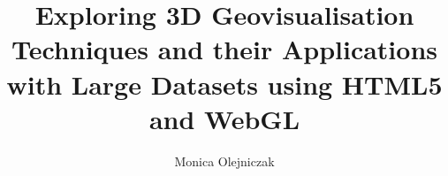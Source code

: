 \linespread{1.25}

\usepackage[left=30mm,top=35mm,right=30mm,bottom=35mm,headheight=30pt]{geometry}

\usepackage[utf8]{inputenc}

\usepackage[dvipsnames]{xcolor}

\usepackage{scrlayer-scrpage}
\cfoot{\pagemark}

\title{Exploring 3D Geovisualisation Techniques and their Applications with Large Datasets using HTML5 and WebGL}
\author{Monica Olejniczak}

\newcommand{\supervisor}{Shamus Smith}
\newcommand{\degree}{Bachelor of Engineering (Honours) (Software)}
\newcommand{\school}{School of Electrical Engineering and Computer Science}
\newcommand{\university}{University of Newcastle}
\newcommand{\country}{Australia}
\newcommand{\institute}{\school\\\university, \country}


\usepackage{abstract}
\setlength{\absleftindent}{0pt}
\setlength{\absrightindent}{0pt}
\renewcommand{\absnamepos}{flushleft}
\renewcommand{\abstractnamefont}{\normalfont\Large\bfseries}

\usepackage{hyperref}

\usepackage{todonotes}

\usepackage{booktabs}
\usepackage{tabularx}
\renewcommand{\arraystretch}{1.5}
\setlength{\textfloatsep}{0.1em}

\usepackage{wrapfig}
\usepackage{caption}
\usepackage[font=scriptsize]{subcaption}

\newcommand{\subfigcaptionskip}{\vspace{-10pt}}

\usepackage{float}
\usepackage{spreadtab}
\usepackage{etoolbox}
\usepackage{setspace}

\usepackage[backend=bibtex,style=authoryear]{biblatex}

\renewcommand*{\bibfont}{\small}
\newcommand{\bibentry}[1]{
	\addtocategory{exclude}{#1}
	\fullcite{#1}
}

\usepackage[toc,page]{appendix}
